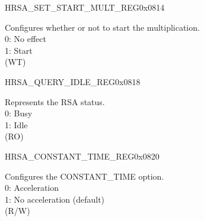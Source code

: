 \begin{register}{H}{RSA\_SET\_START\_MULT\_REG}{0x0814}\label{regdesc:RSASETSTARTMULTREG}
%
%
\regnewline%
\begin{regdesc}\begin{reglist}
\label{fielddesc:RSASETSTARTMULT}\item [RSA\_SET\_START\_MULT] Configures whether or not to start the multiplication.\\
0: No effect\\
1: Start\\ (WT)
\end{reglist}\end{regdesc}
\end{register}


\begin{register}{H}{RSA\_QUERY\_IDLE\_REG}{0x0818}\label{regdesc:RSAQUERYIDLEREG}
%
%
\regnewline%
\begin{regdesc}\begin{reglist}
\label{fielddesc:RSAQUERYIDLE}\item [RSA\_QUERY\_IDLE] Represents the RSA status.\\
0: Busy\\
1: Idle\\ (RO)
\end{reglist}\end{regdesc}
\end{register}


\begin{register}{H}{RSA\_CONSTANT\_TIME\_REG}{0x0820}\label{regdesc:RSACONSTANTTIMEREG}
%
%
\regnewline%
\begin{regdesc}\begin{reglist}
\label{fielddesc:RSACONSTANTTIME}\item [RSA\_CONSTANT\_TIME] Configures the CONSTANT\_TIME option. \\
0: Acceleration\\
1: No acceleration (default)\\ (R/W)
\end{reglist}\end{regdesc}
\end{register}


